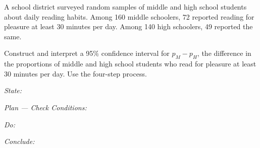 \documentclass[10pt]{article}
\begin{document}
\namedateperiod

\vspace{0.15in}

A school district surveyed random samples of middle and high school students about daily
reading habits. Among 160 middle schoolers, 72 reported reading for pleasure at least
30 minutes per day. Among 140 high schoolers, 49 reported the same.

Construct and interpret a 95\% confidence interval for $p_M - p_H$, the difference in the
proportions of middle and high school students who read for pleasure at least 30 minutes per day.
Use the four-step process.

\textit{State:}
\writeline

\textit{Plan --- Check Conditions:}

\textit{Do:}

\textit{Conclude:}
\end{document}
